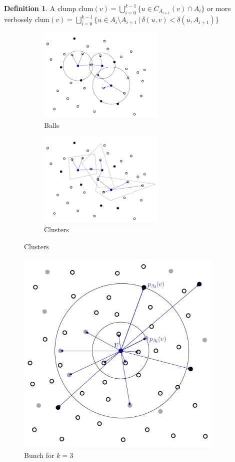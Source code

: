 \documentclass[shortabstract, lic, english]{iithesis}
\theoremstyle{definition} \newtheorem{definition}{Definition}[chapter]
\theoremstyle{plain} \newtheorem{remark}[definition]{Observation}
\theoremstyle{plain} \newtheorem{theorem}[definition]{Theorem}
\theoremstyle{plain} \newtheorem{lemma}[definition]{Lemma}
\theoremstyle{plain} \newtheorem{conjecture}[definition]{Conjecture}
\begin{document}
\begin{definition}
    A clump clum$(v) = \bigcup_{i=0}^{k-1}\{ u \in C_{A_{i+1}}(v) \cap A_i \}$
    \newline
    or more verbosely clum$(v) = \bigcup_{i=0}^{k-1}\{ u\in A_i \setminus A_{i+1} ~|~ \delta(u,v) < \delta(u, A_{i+1}) \}$
\end{definition}

\begin{figure}[H]
    \centering
    \begin{subfigure}[h]{0.495\textwidth}
        \centering
        \includegraphics[width=6cm]{images/balls}
        \caption{Balls}
    \end{subfigure}
    \begin{subfigure}[h]{0.495\textwidth}
        \centering
        \includegraphics[width=6cm]{images/clusters}
        \caption{Clusters}
    \end{subfigure}
\end{figure}

\begin{figure}[H]
    \includegraphics[width=10cm]{images/bunch}
    \centering
    \caption{Bunch for $k=3$}
\end{figure}
\end{document}
